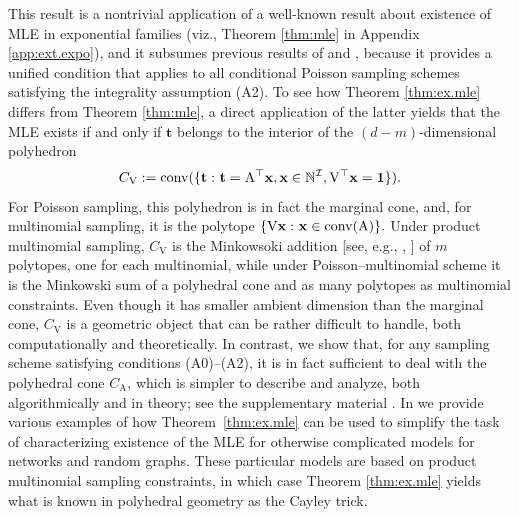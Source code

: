 \documentclass[aos,MSNbibl,nameyear,dvips]{arximspdf}
\newcommand{\m}[1]{\mathrm{#1}}
\newcommand{\bft}{\mathbf{t}}
\newcommand{\bfx}{\mathbf{x}}
\begin{document}
This result is a nontrivial application of a well-known result about
existence of MLE in exponential families (viz., Theorem \ref{thm:mle}
in Appendix \ref{app:ext.expo}), and it subsumes previous results of
\citet{HAB74} and \citet{MLE06}, because it provides a unified
condition that applies to all conditional Poisson sampling schemes
satisfying the integrality assumption (A2).
To see how Theorem \ref{thm:ex.mle} differs from Theorem \ref{thm:mle},
a direct application of the latter yields that the MLE exists if and
only if $\bft$ belongs to the interior of the $(d-m)$-dimensional
polyhedron
%
\[
C_{\m{V}} : = \operatorname{conv}  ( \{ \bft\dvtx \bft= \m{A}^\top
\bfx, \bfx\in\mathbb{N}^\mathcal{I}, \m{V}^\top\bfx= \mathbf{1} \}  ).
\]
%
For Poisson sampling, this polyhedron is in fact the marginal cone,
and, for multinomial sampling,\vadjust{\goodbreak} it is the polytope $\{ \m{V} \mathbf{x}
\dvtx \mathbf{x} \in\operatorname{conv}(\m{A}) \}.$ Under product
multinomial sampling, $C_{\m{V}}$ is the Minkowsoki addition [see,
e.g., \citet{ZIE98}, \citet{SCH98}] of $m$ polytopes, one for each
multinomial, while under Poisson--multinomial scheme it is the Minkowski
sum of a polyhedral cone and as many polytopes as multinomial
constraints. Even though it has smaller ambient dimension than the
marginal cone, $C_{\m{V}}$ is a geometric object that can be rather
difficult to handle, both computationally and theoretically. In
contrast, we show that, for any sampling scheme satisfying conditions
(A0)--(A2), it is in fact sufficient to deal with the polyhedral cone
$C_{\m{A}}$, which is simpler to describe and analyze, both
algorithmically and in theory; see the supplementary material
\citet{FRsupp}. In \citet{NET} we provide various examples of how
Theorem~\ref{thm:ex.mle} can be used to simplify the task of
characterizing existence of the MLE for otherwise complicated models
for networks and random graphs. These particular models are based on
product multinomial sampling constraints, in which case Theorem
\ref{thm:ex.mle} yields what is known in polyhedral geometry as the
Cayley trick.

\end{document}
